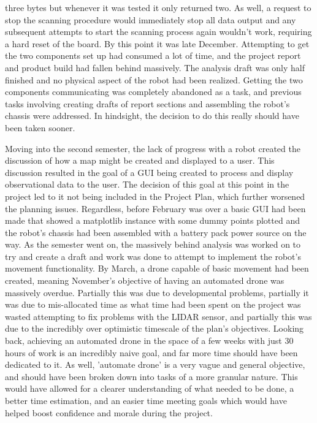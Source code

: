 three bytes but whenever it was tested it only returned two. As well, a request to stop the scanning procedure would immediately stop all data output and any subsequent attempts to start the scanning process again wouldn't work, requiring a hard reset of the board. By this point it was late December. Attempting to get the two components set up had consumed a lot of time, and the project report and product build had fallen behind massively. The analysis draft was only half finished and no physical aspect of the robot had been realized. Getting the two components communicating was completely abandoned as a task, and previous tasks involving creating drafts of report sections and assembling the robot's chassis were addressed. In hindsight, the decision to do this really should have been taken sooner.
		
		Moving into the second semester, the lack of progress with a robot created the discussion of how a map might be created and displayed to a user. This discussion resulted in the goal of a GUI being created to process and display observational data to the user. The decision of this goal at this point in the project led to it not being included in the Project Plan, which further worsened the planning issues. Regardless, before February was over a basic GUI had been made that showed a matplotlib instance with some dummy points plotted and the robot's chassis had been assembled with a battery pack power source on the way. As the semester went on, the massively behind analysis was worked on to try and create a draft and work was done to attempt to implement the robot's movement functionality. By March, a drone capable of basic movement had been created, meaning November's objective of having an automated drone was massively overdue. Partially this was due to developmental problems, partially it was due to mis-allocated time as what time had been spent on the project was wasted attempting to fix problems with the LIDAR sensor, and partially this was due to the incredibly over optimistic timescale of the plan's objectives. Looking back, achieving an automated drone in the space of a few weeks with just 30 hours of work is an incredibly naive goal, and far more time should have been dedicated to it. As well, 'automate drone' is a very vague and general objective, and should have been broken down into tasks of a more granular nature. This would have allowed for a clearer understanding of what needed to be done, a better time estimation, and an easier time meeting goals which would have helped boost confidence and morale during the project. 
		
